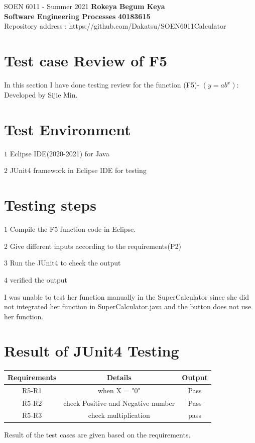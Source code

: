 \documentclass[letterpaper, 11pt]{report}
\begin{document}
\section*{}
\normalsize {SOEN 6011 - Summer 2021} \hfill \textbf{Rokeya Begum Keya} \\
\textbf{ Software Engineering Processes}  \hfill \textbf{40183615} \\
\hfill Repository address : https://github.com/Dakatsu/SOEN6011Calculator
\\

\section*{Test case Review of F5}
In this section I have done testing review for the function (F5)- $(y=ab^x)$: \\Developed by Sijie Min. 
\section*{Test Environment}
\item $1$  Eclipse IDE(2020-2021) for Java
\item $2$  JUnit4 framework in Eclipse IDE for
testing\cite{vogella} 
\section*{Testing steps}
\item $1$ Compile the F5 function code in Eclipse.
\item $2$ Give different inputs according to the requirements(P2)
\item $3$ Run the JUnit4 to check the output
\item $4$ verified the output 
\item I was unable to test her function manually in the SuperCalculator since she did not integrated her function in SuperCalculator.java and the button does not use her function.
\section*{Result of JUnit4 Testing}
\begin{center}
\begin{tabular}{ |c|c|c| }
\hline
Requirements & Details & Output \\
 \hline
 R5-R1 & when X = "0" & Pass \\ 
 R5-R2 & check Positive and Negative number & Pass \\ 
 R5-R3 & check multiplication & pass \\ 
 \hline
\end{tabular}
\end{center}
\item Result of the test cases are given based on the requirements. 
\pagebreak
\end{document}
